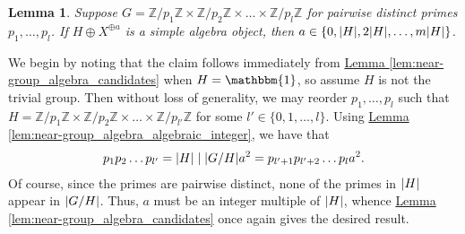 \documentclass[12pt, reqno]{amsart}
\numberwithin{equation}{section}
\theoremstyle{plainspace}
\newtheorem{lemma}[theorem]{Lemma}
\theoremstyle{definitionspace}
\theoremstyle{remarkspace}
\renewenvironment{proof}{{\noindent\textbf{Proof.}}}{\null\hfill\qedsymbol}
\DeclarePairedDelimiter{\abs}{\lvert}{\rvert}
\begin{document}
\begin{lemma}\label{lem:near-group_algebras_distinct_primes_general}
Suppose $G = \mathbb{Z}/p_1\mathbb{Z} \times \mathbb{Z}/p_2\mathbb{Z} \times \dots \times \mathbb{Z}/p_l\mathbb{Z}$ for pairwise distinct primes $p_1, \dots, p_l$. If $H \oplus X^{\oplus a}$ is a simple algebra object, then $a \in \{0, \abs{H}, 2\abs{H}, \dots, m\abs{H}\}$.
\end{lemma}
\leavevmode\newline
\begin{proof}
\noindent We begin by noting that the claim follows immediately from \hyperref[lem:near-group_algebra_candidates]{Lemma \ref*{lem:near-group_algebra_candidates}} when $H = \mathbbm{1}$, so assume $H$ is not the trivial group. Then without loss of generality, we may reorder $p_1, \dots, p_l$ such that $H = \mathbb{Z}/p_1\mathbb{Z} \times \mathbb{Z}/p_2\mathbb{Z} \times \dots \times \mathbb{Z}/p_{l'}\mathbb{Z}$ for some $l' \in \{0, 1, \dots, l\}$. Using \hyperref[lem:near-group_algebra_algebraic_integer]{Lemma \ref*{lem:near-group_algebra_algebraic_integer}}, we have that
\begin{align*}
\begin{split}
p_1 p_2 \dots p_{l'} = \abs{H} \mid \abs{G/H}a^2 = p_{l'+1} p_{l'+2} \dots p_l a^2.
\end{split}
\end{align*}
\noindent Of course, since the primes are pairwise distinct, none of the primes in $\abs{H}$ appear in $\abs{G/H}$. Thus, $a$ must be an integer multiple of $\abs{H}$, whence \hyperref[lem:near-group_algebra_candidates]{Lemma \ref*{lem:near-group_algebra_candidates}} once again gives the desired result.
\end{proof}
\newline
\end{document}
